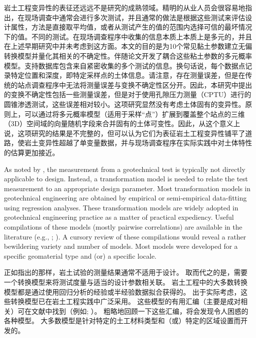 \begin{paracol}{2}
    岩土工程变异性的表征还远远不是研究的成熟领域。精明的从业人员会很容易地指出，在现场调查中通常会进行多次测试，并且通常的做法是根据这些测试来评估设计属性，方法是直接取平均值，或者从测试产生的值的范围内选择可信的最坏情况下的值。不同的测试。在现场调查程序中收集的信息本质上本质上是多元的，并且在上述早期研究中并未考虑到这方面。本文的目的是为10个常见黏土参数建立无偏转换模型并量化其相关的不确定性。伴随论文\citep{Ching2014686}开发了耦合这些粘土参数的多元概率模型。支持数据库包含来自紧密收集的多个测试的信息。换句话说，每个数据点记录特定位置和深度，即特定采样点的土体信息。请注意，存在测量误差，但是在传统的站点调查程序中无法将测量误差与变换不确定性区分开。因此，本研究中提出的变换不确定性包括一些测量误差，但是对于使用孔隙压力测量（CPTU）进行的圆锥渗透测试，这些误差相对较小\citep{Phoon1999612}。这项研究显然没有考虑土体固有的变异性。原则上，可以通过将多元概率模型（适用于采样“点”）扩展到覆盖整个站点的三维（3D）空间域的向量随机字段来合并固有的土体可变性。因此，从这个意义上说，这项研究的结果是不完整的，但可以认为它们为表征岩土工程变异性铺平了道路，使岩土变异性超越了单变量数据，并与现场调查程序在实际实践中对土体特性的估算更加接近。

    \switchcolumn*

    As noted by \citet{Phoon1999612}, the measurement from a geotechnical test is typically not directly applicable to design. Instead, a transformation model is needed to relate the test measurement to an appropriate design parameter. Most transformation models in geotechnical engineering are obtained by empirical or semi-empirical data-fitting using regression analyses. These transformation models are widely adopted in geotechnical engineering practice as a matter of practical expediency. Useful compilations of these models (mostly pairwise correlations) are available in the literature (e.g., \citealp{Kulhawy1990}; \citealp{Mayne2001}). A cursory review of these compilations would reveal a rather bewildering variety and number of models. Most models were developed for a specific geomaterial type and (or) a specific locale.

    \switchcolumn

    正如\citet{Phoon1999612}指出的那样，岩土试验的测量结果通常不适用于设计。 取而代之的是，需要一个转换模型来将测试度量与适当的设计参数相关联。 岩土工程中的大多数转换模型都是通过使用回归分析的经验或半经验数据拟合获得的。 出于实际考虑，这些转换模型已在岩土工程实践中广泛采用。 这些模型的有用汇编（主要是成对相关）可在文献中找到（例如\citealp{Kulhawy1990}; \citealp{Mayne2001}）。 粗略地回顾一下这些汇编，将会发现令人困惑的各种模型。 大多数模型是针对特定的土工材料类型和（或）特定的区域设置而开发的。


\end{paracol}
